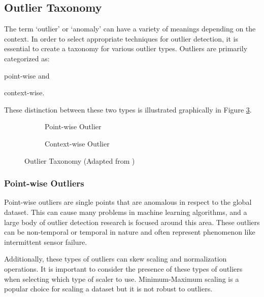 \subsection{Outlier Taxonomy}

The term `outlier' or `anomaly' can have a variety of meanings depending on the context. In order to select appropriate techniques for outlier detection, it is essential to create a taxonomy for various outlier types. Outliers are primarily categorized as:
\begin{inlinelist}
    \item point-wise and
    \item context-wise.
\end{inlinelist}
These distinction between these two types is illustrated graphically in Figure \ref{fig:outliers-graphic}.

\begin{figure}[H]
     \centering
     \begin{subfigure}[b]{0.475\textwidth}
         \centering
         {\resizebox{\textwidth}{!}{}}
         \caption{Point-wise Outlier}
         \label{fig:point}
     \end{subfigure}
     \hfill
     \begin{subfigure}[b]{0.475\textwidth}
         \centering
          {\resizebox{\textwidth}{!}{}}
         \caption{Context-wise Outlier}
         \label{fig:contextual}
     \end{subfigure}
        \caption{Outlier Taxonomy (Adapted from \cite{lai2021revisiting})}
        \label{fig:outliers-graphic}
\end{figure}

\subsubsection{Point-wise Outliers}

Point-wise outliers are single points that are anomalous in respect to the global dataset.
This can cause many problems in machine learning algorithms, and a large body of outlier detection research is focused around this area.
These outliers can be non-temporal or temporal in nature and often represent phenomenon like intermittent sensor failure.

Additionally, these types of outliers can skew scaling and normalization operations.
It is important to consider the presence of these types of outliers when selecting which type of scaler to use.
Minimum-Maximum scaling is a popular choice for scaling a dataset but it is not robust to outliers.

